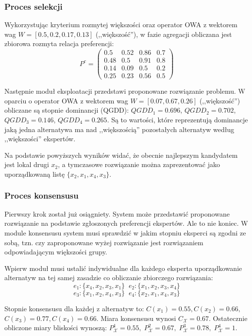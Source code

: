\subsubsection{Proces selekcji}
Wykorzystując kryterium rozmytej większości oraz operator OWA z wektorem wag
$W= [0.5,0.2,0.17,0.13]$ (,,większość''), w fazie agregacji obliczana jest
zbiorowa rozmyta relacja preferencji:
$$
P^c = 
\begin{pmatrix}
0.5  & 0.52  & 0.86   & 0.7  \\
0.48 & 0.5   & 0.91   & 0.8  \\
0.14 & 0.09  & 0.5    & 0.2  \\
0.25 & 0.23  & 0.56   & 0.5
\end{pmatrix}
$$

Następnie moduł eksploatacji przedstawi proponowane rozwiązanie problemu. W
oparciu o operator OWA z wektorem wag $W = [0.07, 0.67, 0.26]$ (,,większość'')
obliczane są stopnie dominancji (QGDD): $QGDD_1 = 0.696$, $QGDD_2 = 0.702$,
$QGDD_3 = 0.146$, $QGDD_4 = 0.265$. Są to wartości, które reprezentują
dominancje jaką jedna alternatywa ma nad ,,większością'' pozostałych alternatyw
według ,,większości'' ekspertów.

Na podstawie powyższych wyników widać, że obecnie najlepszym kandydatem jest
lokal drugi $x_2$, a tymczasowe rozwiązanie można zaprezentować jako
uporządkowaną listę $\{ x_2, x_1,x_4, x_3\}$.

\subsubsection{Proces konsensusu}
Pierwszy krok został już osiągniety. System może przedstawić proponowane
rozwiązanie na podstawie zgłoszonych preferencji ekspertów. Ale to nie koniec. W
module konsensusu system musi sprawdzić w jakim stopniu eksperci są zgodni ze
sobą, tzn. czy zaproponowane wyżej rozwiązanie jest rozwiązaniem odpowiadającym
większości grupy.

Wpierw moduł musi ustalić indywidualne dla każdego eksperta uporządkowanie
alternatyw na tej samej zasadzie co obliczanie zbiorczego rozwiązania:
$$e_1: \{ x_4, x_2, x_3, x_1 \} \;\; e_2: \{ x_1, x_2, x_3, x_4 \}$$
$$e_3: \{ x_1, x_2, x_4, x_3 \} \;\; e_4: \{ x_2, x_1, x_4, x_3 \}$$

Stopnie konsensusu dla każdej z alternatyw to: $C(x_1) = 0.55, C(x_2) =
0.66,$ $C(x_3) = 0.77, C(x_4) = 0.66.$ Miara konsensusu wynosi
$C_{\mathcal{X}} = 0.67$.
Ostatecznie obliczone miary bliskości wynoszą: $P^1_{\mathcal{X}} = 0.55,\;
P^2_{\mathcal{X}} = 0.67,\; P^3_{\mathcal{X}} = 0.78,\; P^4_{\mathcal{X}} = 1$.

